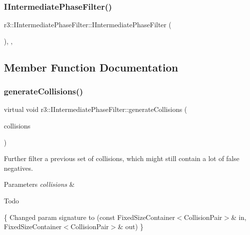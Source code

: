 \subsubsection{\texorpdfstring{I\+Intermediate\+Phase\+Filter()}{IIntermediatePhaseFilter()}}
{\footnotesize\ttfamily r3\+::\+I\+Intermediate\+Phase\+Filter\+::\+I\+Intermediate\+Phase\+Filter (\begin{DoxyParamCaption}{ }\end{DoxyParamCaption})\hspace{0.3cm}{\ttfamily [explicit]}, {\ttfamily [protected]}, {\ttfamily [default]}}



\subsection{Member Function Documentation}
\mbox{\label{classr3_1_1_i_intermediate_phase_filter_a0b235161317095e134661aa49beb909d}} 
\subsubsection{\texorpdfstring{generate\+Collisions()}{generateCollisions()}}
{\footnotesize\ttfamily virtual void r3\+::\+I\+Intermediate\+Phase\+Filter\+::generate\+Collisions (\begin{DoxyParamCaption}\item[{\mbox{\hyperlink{classr3_1_1_fixed_size_container}{Fixed\+Size\+Container}}$<$ \mbox{\hyperlink{classr3_1_1_collision_pair}{Collision\+Pair}} $>$ \&}]{collisions }\end{DoxyParamCaption})\hspace{0.3cm}{\ttfamily [pure virtual]}}



Further filter a previous set of collisions, which might still contain a lot of false negatives. 


\begin{DoxyParams}{Parameters}
{\em collisions} & \\
\hline
\end{DoxyParams}
\begin{DoxyRefDesc}{Todo}
\item[\mbox{\hyperlink{todo__todo000011}{Todo}}]\{ Changed param signature to (const Fixed\+Size\+Container$<$\+Collision\+Pair$>$\& in, Fixed\+Size\+Container$<$\+Collision\+Pair$>$\& out) \} \end{DoxyRefDesc}



